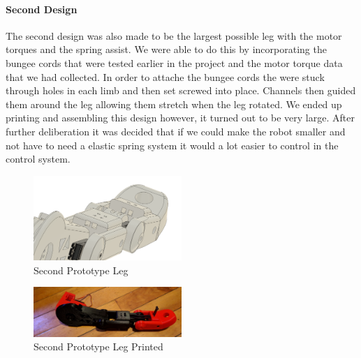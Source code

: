         \paragraph{Second Design}
        The second design was also made to be the largest possible leg with the motor torques and the spring assist. We were able to do this by incorporating the bungee cords that were tested earlier in the project and the motor torque data that we had collected. In order to attache the bungee cords the were stuck through holes in each limb and then set screwed into place. Channels then guided them around the leg allowing them stretch when the leg rotated. We ended up printing and assembling this design however, it turned out to be very large. After further deliberation it was decided that if we could make the robot smaller and not have to need a elastic spring system it would a lot easier to control in the control system. 
        
         \begin{figure}[H]
                \centering
                \includegraphics[width=0.5\textwidth]{figures/Prototype2.png}
                \caption{Second Prototype Leg}
                \label{fig:SecondPrototypeLeg}
        \end{figure}                
            
        \begin{figure}[H]
                \centering
                \includegraphics[width=0.5\textwidth]{figures/prototype2printed.jpg}
                \caption{Second Prototype Leg Printed}
                \label{fig:SecondPrototypeLegPrinted}
        \end{figure}    
        
